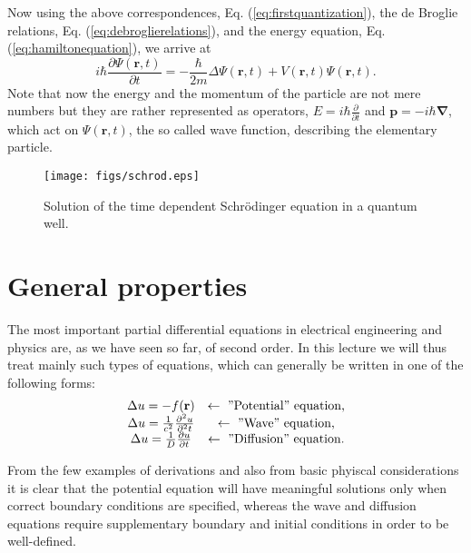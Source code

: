 Now using the above correspondences, Eq. (\ref{eq:firstquantization}), the de
Broglie relations, Eq. (\ref{eq:debroglierelations}), and the energy equation,
Eq. (\ref{eq:hamiltonequation}), we arrive at
\begin{equation}
i\hbar\frac{\partial\Psi\left(  \mathbf{r},t\right)  }{\partial t}%
=-\frac{\hbar}{2m}\Delta\Psi\left(  \mathbf{r},t\right)  +V\left(
\mathbf{r},t\right)  \Psi\left(  \mathbf{r},t\right)
.\label{eq:schroedingerequation}%
\end{equation}
Note that now the energy and the momentum of the particle are not mere numbers
but they are rather represented as operators, $E=i\hbar\frac{\partial
}{\partial t}$ and $\mathbf{p}=-i\hbar\mathbf{\nabla}$, which act on
$\Psi(\mathbf{r},t)$, the so called wave function, describing the elementary particle.

\begin{figure}[ptbh]
\centering\texttt{[image: figs/schrod.eps]}\caption{Solution of
the time dependent Schr\"{o}dinger equation in a quantum well.}%
\label{fig:schrod}%
\end{figure}

\section{General properties}

The most important partial differential equations in electrical engineering
and physics are, as we have seen so far, of second order. In this lecture we
will thus treat mainly such types of equations, which can generally be written
in one of the following forms:%
\[%
\begin{array}
[c]{cc}%
\Delta u=-f(\mathbf{r}) & \leftarrow\text{ ''Potential'' equation,}\\
\Delta u=\frac{1}{c^{2}}\frac{\partial^{2}u}{\partial^{2}t} & \leftarrow\text{
''Wave'' equation,}\\
\Delta u=\frac{1}{D}\frac{\partial u}{\partial t} & \leftarrow\text{
''Diffusion'' equation.}%
\end{array}
\]

From the few examples of derivations and also from basic phyiscal
considerations it is clear that the potential equation will have meaningful
solutions only when correct boundary conditions are specified, whereas the
wave and diffusion equations require supplementary boundary and initial
conditions in order to be well-defined.